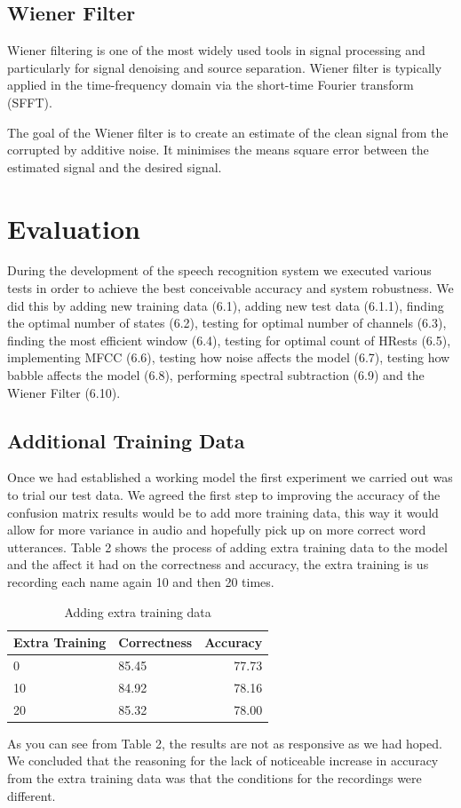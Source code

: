 \documentclass[	DIV=calc,%
							paper=a4,%
							fontsize=9.8pt,%
							twocolumn]{scrartcl}	 					%
\begin{document}
\subsection{Wiener Filter}
Wiener filtering is one of the most widely used tools in signal processing and particularly for signal denoising and source separation. Wiener filter is typically applied in the time-frequency domain via the short-time Fourier transform (SFFT). \cite{DBLP:journals/spl/RouxV13}

The goal of the Wiener filter is to create an estimate of the clean signal from the corrupted by additive noise. It minimises the means square error between the estimated signal and the desired signal. \cite{DBLP:journals/ieiceee/Kim15}

\section{Evaluation}
During the development of the speech recognition system we executed various tests in order to achieve the best conceivable accuracy and system robustness. We did this by adding new training data (6.1), adding new test data (6.1.1), finding the optimal number of states (6.2), testing for optimal number of channels (6.3), finding the most efficient window (6.4), testing for optimal count of HRests (6.5), implementing MFCC (6.6), testing how noise affects the model (6.7), testing how babble affects the model (6.8), performing spectral subtraction (6.9) and the Wiener Filter (6.10).
\subsection{Additional Training Data}
 Once we had established a working model the first experiment we carried out was to trial our test data. We agreed the first step to improving the accuracy of the confusion matrix results would be to add more training data, this way it would allow for more variance in audio and hopefully pick up on more correct word utterances. Table 2 shows the process of adding extra training data to the model and the affect it had on the correctness and accuracy, the extra training is us recording each name again 10 and then 20 times.
 


\begin{table}[h]
	\caption{Adding extra training data}
	\centering
	\begin{tabular}{llr}
		
		\cmidrule(r){1-3}
		Extra Training & Correctness & Accuracy \\
		\midrule
		0 & 85.45 & 77.73 \\
		10  & 84.92  & 78.16 \\
		20   & 85.32  & 78.00 \\
		
	\end{tabular}
\end{table}
 As you can see from Table 2, the results are not as responsive as we had hoped. We concluded that the reasoning for the lack of noticeable increase in accuracy from the extra training data was that the conditions for the recordings were different.
 
\end{document}
